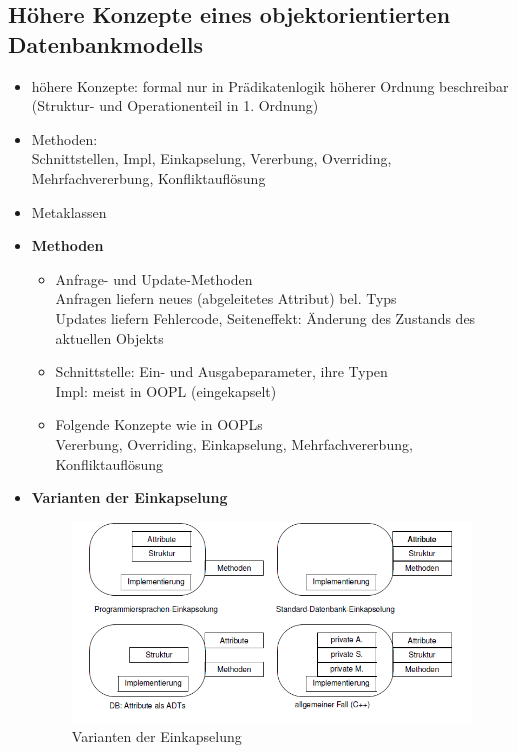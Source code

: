 \subsection{Höhere Konzepte eines objektorientierten Datenbankmodells}
\begin{itemize}
	\item höhere Konzepte: formal nur in Prädikatenlogik höherer Ordnung beschreibar (Struktur- und Operationenteil in 1. Ordnung)
	\item Methoden:\\
	Schnittstellen, Impl, Einkapselung, Vererbung, Overriding, Mehrfachvererbung, Konfliktauflösung
	\item Metaklassen
	
	\item \textbf{Methoden}
	\begin{itemize}
		\item Anfrage- und Update-Methoden\\
		Anfragen liefern neues (abgeleitetes Attribut) bel. Typs\\
		Updates liefern Fehlercode, Seiteneffekt: Änderung des Zustands des aktuellen Objekts
		
		\item Schnittstelle: Ein- und Ausgabeparameter, ihre Typen\\
		Impl: meist in OOPL (eingekapselt)
		
		\item Folgende Konzepte wie in OOPLs\\
		Vererbung, Overriding, Einkapselung, Mehrfachvererbung, Konfliktauflösung
	\end{itemize}
	
	\newpage
	\item \textbf{Varianten der Einkapselung}
	\begin{figure}[!h]
		\centering
		\includegraphics[scale=0.6]{img/einkapselung.png}
		\caption{Varianten der Einkapselung}
	\end{figure}
	

\end{itemize}
